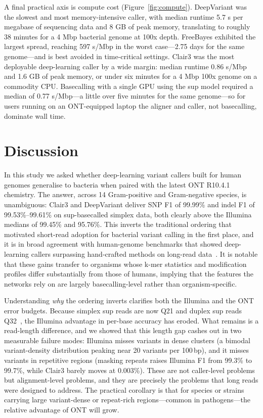 \documentclass[11pt]{article}
\begin{document}
A final practical axis is compute cost (Figure~\ref{fig:compute}). DeepVariant was the slowest and most memory-intensive caller, with median runtime 5.7 s per megabase of sequencing data and 8 GB of peak memory, translating to roughly 38 minutes for a 4 Mbp bacterial genome at 100x depth. FreeBayes exhibited the largest spread, reaching 597 s/Mbp in the worst case---2.75 days for the same genome---and is best avoided in time-critical settings. Clair3 was the most deployable deep-learning caller by a wide margin: median runtime 0.86 s/Mbp and 1.6 GB of peak memory, or under six minutes for a 4 Mbp 100x genome on a commodity CPU. Basecalling with a single GPU using the sup model required a median of 0.77 s/Mbp---a little over five minutes for the same genome---so for users running on an ONT-equipped laptop the aligner and caller, not basecalling, dominate wall time.

\section{Discussion}

In this study we asked whether deep-learning variant callers built for human genomes generalise to bacteria when paired with the latest ONT R10.4.1 chemistry. The answer, across 14 Gram-positive and Gram-negative species, is unambiguous: Clair3 and DeepVariant deliver SNP F1 of 99.99\% and indel F1 of 99.53\%--99.61\% on sup-basecalled simplex data, both clearly above the Illumina medians of 99.45\% and 95.76\%. This inverts the traditional ordering that motivated short-read adoption for bacterial variant calling in the first place, and it is in broad agreement with human-genome benchmarks that showed deep-learning callers surpassing hand-crafted methods on long-read data~\citep{olson2022giab}. It is notable that these gains transfer to organisms whose k-mer statistics and modification profiles differ substantially from those of humans, implying that the features the networks rely on are largely basecalling-level rather than organism-specific.

Understanding \emph{why} the ordering inverts clarifies both the Illumina and the ONT error budgets. Because simplex sup reads are now Q21 and duplex sup reads Q32~\citep{sereika2022oxford,wick2023perfect}, the Illumina advantage in per-base accuracy has eroded. What remains is a read-length difference, and we showed that this length gap cashes out in two measurable failure modes: Illumina misses variants in dense clusters (a bimodal variant-density distribution peaking near 20 variants per 100\,bp), and it misses variants in repetitive regions (masking repeats raises Illumina F1 from 99.3\% to 99.7\%, while Clair3 barely moves at 0.003\%). These are not caller-level problems but alignment-level problems, and they are precisely the problems that long reads were designed to address. The practical corollary is that for species or strains carrying large variant-dense or repeat-rich regions---common in pathogens---the relative advantage of ONT will grow.
\end{document}
